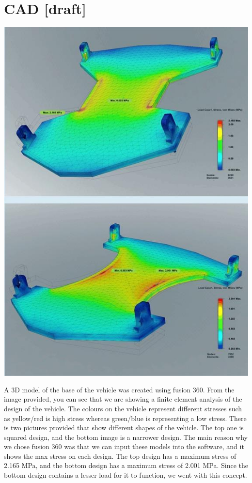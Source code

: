 \documentclass{article}
\begin{document}
\section{CAD [draft]}
\begin{minipage}{0.4\textwidth}
	\centering
	\includegraphics[width=1\textwidth]{extracted_images2/image_9_2.png}
\end{minipage}\hfil
\begin{minipage}{0.55\textwidth}
	A 3D model of the base of the vehicle was created using fusion 360. From the image provided, you can see that we are showing a finite element analysis of the design of the vehicle. The colours on the vehicle represent different stresses such as yellow/red is high stress whereas green/blue is representing a low stress. There is two pictures provided that show different shapes of the vehicle. The top one is squared design, and the bottom image is a narrower design. The main reason why we chose fusion 360 was that we can input these models into the software, and it shows the max stress on each design. The top design has a maximum stress of 2.165 MPa, and the bottom design has a maximum stress of 2.001 MPa. Since the bottom design contains a lesser load for it to function, we went with this concept.
\end{minipage}\\[8pt]
\end{document}
